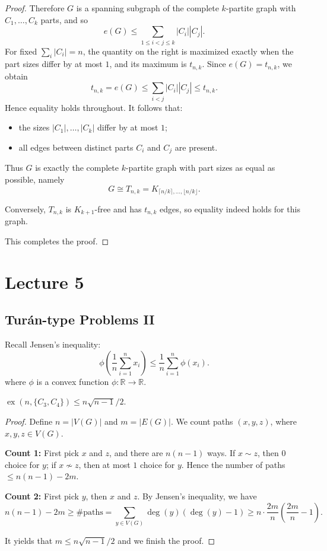 \documentclass[11pt, a4paper]{ctexrep}
\begin{document}
\begin{proof}
    Therefore $G$ is a spanning subgraph of the complete $k$-partite graph with
    $C_1,\dots,C_k$ parts, and so
    \[
        e(G)\le \sum_{1\le i<j\le k} |C_i||C_j|.
    \]
    For fixed $\sum_i |C_i|=n$, the quantity on the right is maximized exactly when the part
    sizes differ by at most $1$, and its maximum is $t_{n,k}$.
    Since $e(G)=t_{n,k}$, we obtain
    \[
        t_{n,k}=e(G)\le \sum_{i<j}|C_i||C_j|\le t_{n,k}.
    \]
    Hence equality holds throughout. It follows that:
    \begin{itemize}
        \item the sizes $|C_1|,\dots,|C_k|$ differ by at most $1$;
        \item all edges between distinct parts $C_i$ and $C_j$ are present.
    \end{itemize}
    Thus $G$ is exactly the complete $k$-partite graph with part sizes as equal as possible,
    namely
    \[
        G\cong T_{n,k}=K_{\lceil n/k\rceil,\ldots,\lfloor n/k\rfloor}.
    \]

    Conversely, $T_{n,k}$ is $K_{k+1}$-free and has $t_{n,k}$ edges, so equality indeed holds
    for this graph.

    This completes the proof.
\end{proof}

\chapter{Lecture 5}

\section{Tur\'an-type Problems II}

Recall Jensen's inequality:
\[
    \phi\left(\frac{1}{n}\sum_{i=1}^n x_i\right) \leq \frac{1}{n}\sum_{i=1}^n \phi(x_i).
\]
where $\phi$ is a convex function $\phi: \mathbb{R} \to \mathbb{R}$.

\begin{theorem}
    $\operatorname{ex}(n,\{C_3,C_4\})\leqslant n\sqrt{n-1}/2$.
\end{theorem}

\begin{proof}
    Define $n=|V(G)|$ and $m=|E(G)|$.
    We count paths $(x,y,z)$, where $x,y,z\in V(G)$.

    \medskip
    \noindent
    \textbf{Count 1:} First pick $x$ and $z$, and there are $n(n-1)$ ways.
    If $x\sim z$, then $0$ choice for $y$; if $x\nsim z$, then at most $1$ choice for $y$.
    Hence the number of paths $\leqslant n(n-1)-2m$.

    \medskip
    \noindent
    \textbf{Count 2:} First pick $y$, then $x$ and $z$.
    By Jensen's inequality, we have
    \[
        n(n-1)-2m\geqslant\#\text{paths}=\sum_{y\in V(G)}\deg(y)(\deg(y)-1)\geqslant n\cdot\frac{2m}{n}\left(\frac{2m}{n}-1\right).
    \]

    It yields that $m\leqslant n\sqrt{n-1}/2$ and we finish the proof.
\end{proof}
\end{document}
